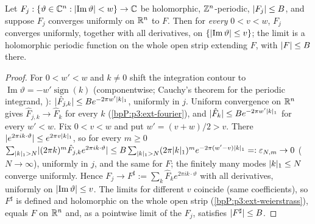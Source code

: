 \begin{lemma}\label{bpP:p3:fourier-compact}
Let $F_j:\{\vartheta\in\mathbb{C}^n:\lvert \operatorname{Im}\vartheta\rvert<w\}\to\mathbb{C}$ be holomorphic, $\mathbb{Z}^n$-periodic, $\lvert F_j\rvert\le B$, and suppose $F_j$ converges uniformly on $\mathbb{R}^n$ to $F$. Then for \emph{every} $0<v<w$, $F_j$ converges uniformly, together with all derivatives, on $\{\lvert \operatorname{Im}\vartheta\rvert\le v\}$; the limit is a holomorphic periodic function on the whole open strip extending $F$, with $\lvert F\rvert\le B$ there.
\end{lemma}
\begin{proof}
\label{stepP:p3:fc-decay}
For $0<w'<w$ and $k\ne0$ shift the integration contour to $\operatorname{Im}\vartheta=-w'\operatorname{sign}(k)$ (componentwise; Cauchy's theorem for the periodic integrand, ): $\lvert \hat F_{j,k}\rvert\le Be^{-2\pi w'\lvert k\rvert_1}$, uniformly in $j$.
\label{stepP:p3:fc-coef}
Uniform convergence on $\mathbb{R}^n$ gives $\hat F_{j,k}\to\hat F_k$ for every $k$ (\ref{bpP:p3:ext-fourier}), and $\lvert \hat F_k\rvert\le Be^{-2\pi w'\lvert k\rvert_1}$ for every $w'<w$.
\label{stepP:p3:fc-tail}
Fix $0<v<w$ and put $w'=(v+w)/2>v$. There $\lvert e^{2\pi ik\cdot\vartheta}\rvert\le e^{2\pi v\lvert k\rvert_1}$, so for every $m\ge0$
$\sum_{\lvert k\rvert_1>N}\lvert (2\pi k)^{m}\hat F_{j,k}e^{2\pi ik\cdot\vartheta}\rvert\le B\sum_{\lvert k\rvert_1>N}(2\pi\lvert k\rvert_1)^me^{-2\pi(w'-v)\lvert k\rvert_1}=:\varepsilon_{N,m}\to0$ ($N\to\infty$), uniformly in $j$, and the same for $F$; the finitely many modes $\lvert k\rvert_1\le N$ converge uniformly. Hence $F_j\to F^\sharp:=\sum_k\hat F_ke^{2\pi ik\cdot\vartheta}$ with all derivatives, uniformly on $\lvert \operatorname{Im}\vartheta\rvert\le v$. The limits for different $v$ coincide (same coefficients), so $F^\sharp$ is defined and holomorphic on the whole open strip (\ref{bpP:p3:ext-weierstrass}), equals $F$ on $\mathbb{R}^n$ and, as a pointwise limit of the $F_j$, satisfies $\lvert F^\sharp\rvert\le B$.
\end{proof}

